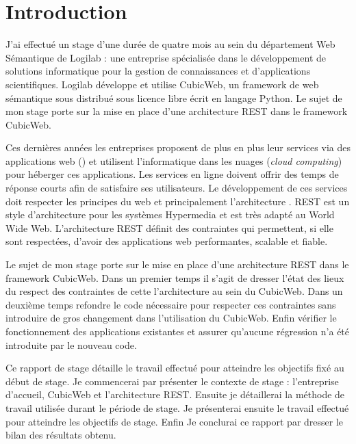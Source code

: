 \chapter*{Introduction}
J'ai effectué un stage d'une durée de quatre mois au sein du département Web Sémantique de Logilab : une entreprise spécialisée dans le développement de solutions informatique pour la gestion de connaissances et d'applications scientifiques. Logilab développe et utilise CubicWeb, un framework de web sémantique sous distribué sous licence libre écrit en langage Python. Le sujet de mon stage porte sur la mise en place d'une architecture REST dans le framework CubicWeb.

Ces dernières années les entreprises proposent de plus en plus leur services via des applications web (\textit{}) et utilisent l'informatique dans les nuages (\textit{cloud computing}) pour héberger ces applications. Les services en ligne doivent offrir des temps de réponse courts afin de satisfaire ses utilisateurs. Le développement de ces services doit respecter les principes du web et principalement l'architecture . REST est un style d'architecture pour les systèmes Hypermedia et est très adapté au World Wide Web. L'architecture REST définit des contraintes qui permettent, si elle sont respectées, d'avoir des applications web performantes, scalable et fiable.

Le sujet de mon stage porte sur le mise en place d'une architecture REST dans le framework CubicWeb. Dans un premier temps il s'agit de dresser l'état des lieux du respect des contraintes de cette l'architecture au sein du CubicWeb. Dans un deuxième temps refondre le code nécessaire pour respecter ces contraintes sans introduire de gros changement dans l'utilisation du CubicWeb. Enfin vérifier le fonctionnement des applications existantes et assurer qu'aucune régression n'a été introduite par le nouveau code.

Ce rapport de stage détaille le travail effectué pour atteindre les objectifs fixé au début de stage. Je commencerai par présenter le contexte de stage : l'entreprise d'accueil, CubicWeb et l'architecture REST. Ensuite je détaillerai la méthode de travail utilisée durant le période de stage. Je présenterai ensuite le travail effectué pour atteindre les objectifs de stage. Enfin Je conclurai ce rapport par dresser le bilan des résultats obtenu.